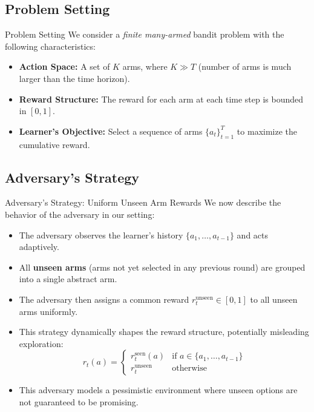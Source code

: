 \documentclass{beamer}
\begin{document}
\subsection{Problem Setting}
\begin{frame}{Problem Setting}
    We consider a \textit{finite many-armed} bandit problem with the following characteristics:

    \begin{itemize}
        \item \textbf{Action Space:} A set of $K$ arms, where $K \gg T$ (number of arms is much larger than the time horizon).
        \item \textbf{Reward Structure:} The reward for each arm at each time step is bounded in $[0, 1]$.
        \item \textbf{Learner's Objective:} Select a sequence of arms $\{a_t\}_{t=1}^T$ to maximize the cumulative reward.
    \end{itemize}
\end{frame}


\subsection{Adversary’s Strategy}
\begin{frame}{Adversary’s Strategy: Uniform Unseen Arm Rewards}
    We now describe the behavior of the adversary in our setting:

    \begin{itemize}
        \item The adversary observes the learner’s history $\{a_1, \dots, a_{t-1}\}$ and acts adaptively.
        \item All \textbf{unseen arms} (arms not yet selected in any previous round) are grouped into a single abstract arm.
        \item The adversary then assigns a common reward $r_t^{\text{unseen}} \in [0,1]$ to all unseen arms uniformly.
        \item This strategy dynamically shapes the reward structure, potentially misleading exploration:
        \[
            r_t(a) =
            \begin{cases}
                r_t^{\text{seen}}(a) & \text{if } a \in \{a_1, \dots, a_{t-1}\} \\
                r_t^{\text{unseen}} & \text{otherwise}
            \end{cases}
        \]
        \item This adversary models a pessimistic environment where unseen options are not guaranteed to be promising.
    \end{itemize}
\end{frame}
\end{document}
